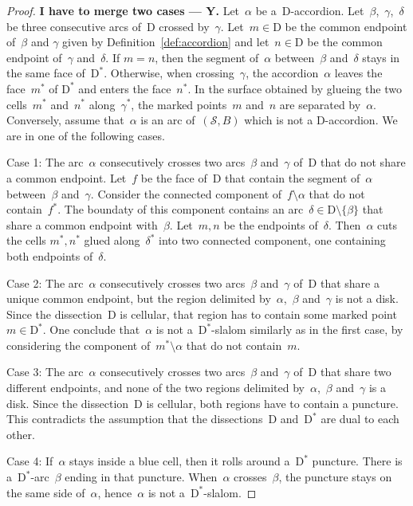 \documentclass{amsart}
\theoremstyle{definition}
\newcommand{\yann}[1]{\textbf{#1 --- Y.}} %
\newcommand{\surface}{\mathcal{S}} %
\newcommand{\dual}{^*} %
\newcommand{\dissection}{\mathrm{D}} %
\begin{document}
\begin{proof}
\yann{I have to merge two cases}
Let~$\alpha$ be a~$\dissection$-accordion.
Let~$\beta$,~$\gamma$,~$\delta$ be three consecutive arcs of~$\dissection$ crossed by~$\gamma$.
Let~$m\in\dissection$ be the common endpoint of~$\beta$ and $\gamma$ given by Definition~\ref{def:accordion} and let~$n\in\dissection$ be the common endpoint of~$\gamma$ and~$\delta$.
If $m=n$, then the segment of~$\alpha$ between~$\beta$ and~$\delta$ stays in the same face of~$\dissection\dual$.
Otherwise, when crossing~$\gamma$, the accordion~$\alpha$ leaves the face~$m\dual$ of $\dissection\dual$ and enters the face~$n\dual$.
In the surface obtained by glueing the two cells~$m\dual$ and~$n\dual$ along~$\gamma\dual$, the marked points~$m$ and~$n$ are separated by~$\alpha$.
Conversely, assume that~$\alpha$ is an arc of~$(\surface, B)$ which is not a $\dissection$-accordion.
We are in one of the following cases.

Case 1: The arc~$\alpha$ consecutively crosses two arcs~$\beta$ and~$\gamma$ of~$\dissection$ that do not share a common endpoint.
Let~$f$ be the face of~$\dissection$ that contain the segment of~$\alpha$ between~$\beta$ and~$\gamma$.
Consider the connected component of~$f\setminus\alpha$ that do not contain~$f\dual$.
The boundaty of this component contains an arc~$\delta\in\dissection\setminus\{\beta\}$ that share a common endpoint with~$\beta$.
Let~$m,n$ be the endpoints of~$\delta$.
Then~$\alpha$ cuts the cells $m\dual,n\dual$ glued along~$\delta\dual$ into two connected component, one containing both endpoints of~$\delta$.

Case 2: The arc~$\alpha$ consecutively crosses two arcs~$\beta$ and~$\gamma$ of~$\dissection$ that share a unique common endpoint, but the region delimited by~$\alpha$,~$\beta$ and~$\gamma$ is not a disk.
Since the dissection~$\dissection$ is cellular, that region has to contain some marked point~$m\in\dissection\dual$.
One conclude that~$\alpha$ is not a~$\dissection\dual$-slalom similarly as in the first case, by considering the component of~$m\dual\setminus\alpha$ that do not contain~$m$.

Case 3: The arc~$\alpha$ consecutively crosses two arcs~$\beta$ and~$\gamma$ of~$\dissection$ that share two different endpoints, and none of the two regions delimited by~$\alpha$,~$\beta$ and~$\gamma$ is a disk.
Since the dissection~$\dissection$ is cellular, both regions have to contain a puncture.
This contradicts the assumption that the dissections~$\dissection$ and~$\dissection\dual$ are dual to each other.

Case 4: If~$\alpha$ stays inside a blue cell, then it rolls around a~$\dissection\dual$ puncture.
There is a~$\dissection\dual$-arc~$\beta$ ending in that puncture. When~$\alpha$ crosses~$\beta$, the puncture stays on the same side of~$\alpha$, hence~$\alpha$ is not a~$\dissection\dual$-slalom.
\end{proof}
\end{document}
